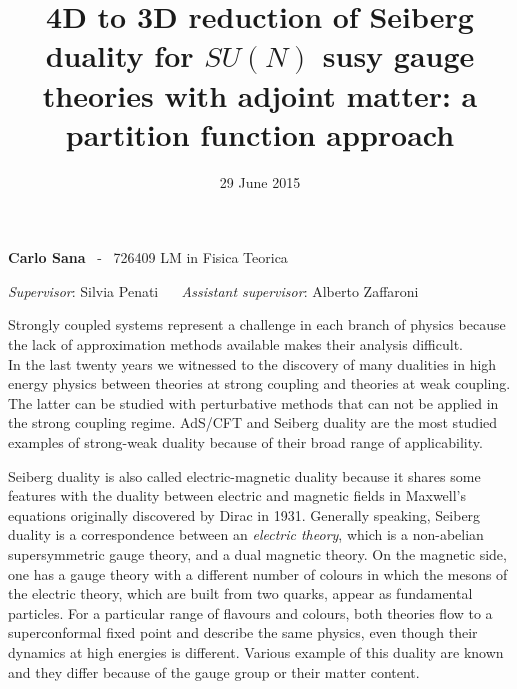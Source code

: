 \documentclass[a4paper,12pt]{article}
\date{}
\title{ \textbf{4D to 3D reduction of Seiberg duality for $SU(N)$ susy gauge theories with adjoint matter: a partition function approach }}
\date{29 June 2015}
\begin{document}
\maketitle
\vspace*{-1.5cm}
	 \textbf{Carlo Sana}  ~-~ 726409  \hfill
 LM in Fisica Teorica 
\\
\vspace{-0.5cm}
\begin{center}
\emph{Supervisor}: 
\textsf{Silvia Penati} 
~~
\emph{Assistant supervisor}:
\textsf{Alberto Zaffaroni}

\end{center}



Strongly coupled systems represent a challenge in each branch of physics because the lack of approximation methods available makes their analysis difficult.\\
In the last twenty years we witnessed to the discovery of many dualities in high energy physics between theories at strong coupling and theories at weak coupling.
The latter can be studied with perturbative methods that can not be applied in the strong coupling regime.
AdS/CFT and Seiberg duality are the most studied examples of strong-weak duality because of their broad range of applicability.

Seiberg duality is also called electric-magnetic duality because it shares some features with the duality between electric and magnetic fields in Maxwell's equations originally discovered by Dirac in 1931.
Generally speaking, Seiberg duality is a correspondence between an \emph{electric theory}, which is a non-abelian supersymmetric gauge theory, and a dual magnetic theory. 
On the magnetic side, one has a gauge theory with a different number of colours  in which the mesons of the electric theory, which are built from two quarks, appear as fundamental particles.
For a particular range of flavours and colours, both theories flow to a superconformal fixed point and describe the same physics, even though their dynamics at high energies is different.
Various example of this duality are known and they differ because of the gauge group or their matter content.
\end{document}
